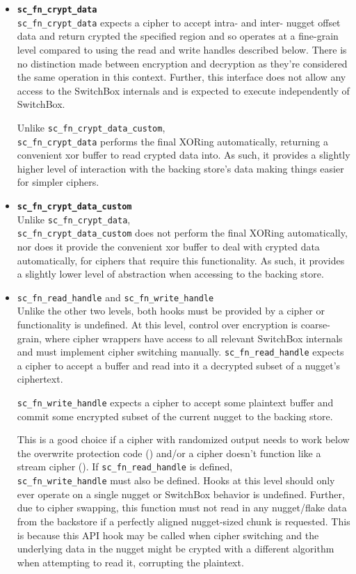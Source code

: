 \begin{itemize}
   \item \textbf{\texttt{sc\_fn\_crypt\_data}}\\\texttt{sc\_fn\_crypt\_data}
   expects a cipher to accept intra- and inter- nugget offset data and return
   crypted the specified region and so operates at a fine-grain level compared
   to using the read and write handles described below. There is no distinction
   made between encryption and decryption as they're considered the same
   operation in this context. Further, this interface does not allow any access
   to the SwitchBox internals and is expected to execute independently of
   SwitchBox.

   Unlike \texttt{sc\_fn\_crypt\_data\_custom},
   \\\texttt{sc\_fn\_crypt\_data} performs the final XORing automatically,
   returning a convenient xor buffer to read crypted data into. As such, it
   provides a slightly higher level of interaction with the backing store's data
   making things easier for simpler ciphers.
   \item \textbf{\texttt{sc\_fn\_crypt\_data\_custom}}\\Unlike
   \texttt{sc\_fn\_crypt\_data}, \\\texttt{sc\_fn\_crypt\_data\_custom} does not
   perform the final XORing automatically, nor does it provide the convenient
   xor buffer to deal with crypted data automatically, for ciphers that require
   this functionality. As such, it provides a slightly lower level of
   abstraction when accessing to the backing store.
   \item \texttt{sc\_fn\_read\_handle} and \texttt{sc\_fn\_write\_handle}\\
   Unlike the other two levels, both hooks must be provided by a cipher or
   functionality is undefined. At this level, control over encryption is
   coarse-grain, where cipher wrappers have access to all relevant SwitchBox
   internals and must implement cipher switching manually.
   \texttt{sc\_fn\_read\_handle} expects a cipher to accept a buffer and read
   into it a decrypted subset of a nugget's ciphertext.

   \texttt{sc\_fn\_write\_handle} expects a cipher to accept
   some plaintext buffer and commit some encrypted subset of the current nugget
   to the backing store.

   This is a good choice if a cipher with randomized output needs to work below
   the overwrite protection code () and/or a cipher doesn't
   function like a stream cipher (). If
   \texttt{sc\_fn\_read\_handle} is defined, \\\texttt{sc\_fn\_write\_handle}
   must also be defined. Hooks at this level should only ever operate on a
   single nugget or SwitchBox behavior is undefined. Further, due to cipher
   swapping, this function must not read in any nugget/flake data from the
   backstore if a perfectly aligned nugget-sized chunk is requested. This is
   because this API hook may be called when cipher switching and the underlying
   data in the nugget might be crypted with a different algorithm when
   attempting to read it, corrupting the plaintext.
\end{itemize}


